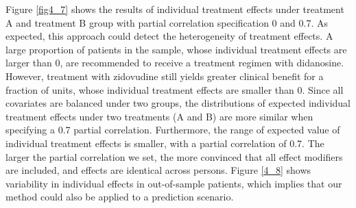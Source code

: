 	Figure \ref{fig4_7} shows the results of individual treatment effects under treatment A and treatment B group with partial correlation specification 0 and 0.7. As expected, this approach could detect the heterogeneity of treatment effects. A large proportion of patients in the sample, whose individual treatment effects are larger than 0, are recommended to receive a treatment regimen with didanosine. However, treatment with zidovudine still yields greater clinical benefit for a fraction of units, whose individual treatment effects are smaller than 0. Since all covariates are balanced under two groups, the distributions of expected individual treatment effects under two treatments (A and B) are more similar when specifying a 0.7 partial correlation. Furthermore, the range of expected value of individual treatment effects is smaller, with a partial correlation of 0.7. The larger the partial correlation we set, the more convinced that all effect modifiers are included, and effects are identical across persons. Figure \ref{4_8} shows variability in individual effects in out-of-sample patients, which implies that our method could also be applied to a prediction scenario. 
